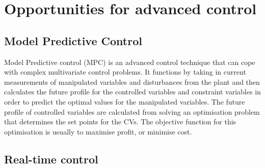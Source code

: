 \section{Opportunities for advanced control}

\subsection{Model Predictive Control}
Model Predictive control (MPC) is an advanced control technique that can cope with complex multivariate control problems. It functions by taking in current measurements of manipulated variables and disturbances from the plant and then calculates the future profile for the controlled variables and constraint variables in order to predict the optimal values for the manipulated variables. The future profile of controlled variables are calculated from solving an optimisation problem that determines the set points for the CVs. The objective function for this optimisation is usually to maximise profit, or minimise cost. 

\subsection{Real-time control}